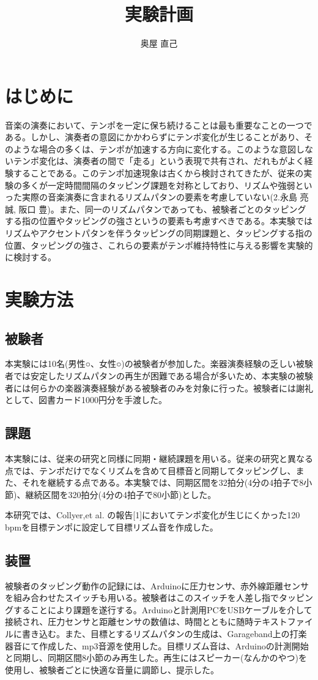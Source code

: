 \documentclass[twocolumn,10pt]{jarticle}
\title{実験計画}
\author{奥屋 直己}
\begin{document}
\maketitle

\section{はじめに}
音楽の演奏において、テンポを一定に保ち続けることは最も重要なことの一つである。しかし、演奏者の意図にかかわらずにテンポ変化が生じることがあり、そのような場合の多くは、テンポが加速する方向に変化する。このような意図しないテンポ変化は、演奏者の間で「走る」という表現で共有され、だれもがよく経験することである。このテンポ加速現象は古くから検討されてきたが、従来の実験の多くが一定時間間隔のタッピング課題を対称としており、リズムや強弱といった実際の音楽演奏に含まれるリズムパタンの要素を考慮していない(2.永島 亮誠, 阪口 豊)。また、同一のリズムパタンであっても、被験者ごとのタッピングする指の位置やタッピングの強さというの要素も考慮すべきである。本実験ではリズムやアクセントパタンを伴うタッピングの同期課題と、タッピングする指の位置、タッピングの強さ、これらの要素がテンポ維持特性に与える影響を実験的に検討する。

\section{実験方法}
\subsection{被験者}
本実験には10名(男性○、女性○)の被験者が参加した。楽器演奏経験の乏しい被験者では安定したリズムパタンの再生が困難である場合が多いため、本実験の被験者には何らかの楽器演奏経験がある被験者のみを対象に行った。被験者には謝礼として、図書カード1000円分を手渡した。

\subsection{課題}
本実験には、従来の研究と同様に同期・継続課題を用いる。従来の研究と異なる点では、テンポだけでなくリズムを含めて目標音と同期してタッピングし、また、それを継続する点である。本実験では、同期区間を32拍分(4分の4拍子で8小節)、継続区間を320拍分(4分の4拍子で80小節)とした。

本研究では、Collyer,et al. の報告[1]においてテンポ変化が生じにくかった120 bpmを目標テンポに設定して目標リズム音を作成した。

\subsection{装置}
被験者のタッピング動作の記録には、Arduinoに圧力センサ、赤外線距離センサを組み合わせたスイッチも用いる。被験者はこのスイッチを人差し指でタッピングすることにより課題を遂行する。Arduinoと計測用PCをUSBケーブルを介して接続され、圧力センサと距離センサの数値は、時間とともに随時テキストファイルに書き込む。また、目標とするリズムパタンの生成は、Garageband上の打楽器音にて作成した、mp3音源を使用した。目標リズム音は、Arduinoの計測開始と同期し、同期区間8小節のみ再生した。再生にはスピーカー(なんかのやつ)を使用し、被験者ごとに快適な音量に調節し、提示した。
\end{document}
